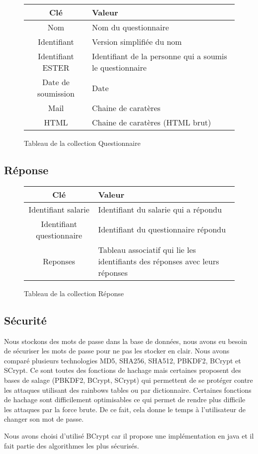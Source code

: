 \begin{figure}[H]
    \begin{center}
        \begin{tabularx}{17cm}{|c|X|}
            \hline
            Clé & Valeur  \tabularnewline 
            \hline
            Nom & 
            Nom du questionnaire \tabularnewline 
            Identifiant & 
            Version simplifiée du nom \tabularnewline
            Identifiant ESTER & 
            Identifiant de la personne qui a soumis le questionnaire \tabularnewline
            Date de soumission & 
            Date \tabularnewline
            Mail & 
            Chaine de caratères \tabularnewline
            HTML & 
            Chaine de caratères (HTML brut) \tabularnewline
            \hline
        \end{tabularx}
    \end{center}
    \caption{Tableau de la collection Questionnaire}
\end{figure}

\subsection{Réponse}

\begin{figure}[H]
    \begin{center}
        \begin{tabularx}{17cm}{|c|X|}
            \hline
            Clé & Valeur  \tabularnewline 
            \hline
            Identifiant salarie & 
            Identifiant du salarie qui a répondu \tabularnewline
            Identifiant questionnaire & 
            Identifiant du questionnaire répondu \tabularnewline
            Reponses & 
            Tableau associatif qui lie les identifiants des réponses 
            avec leurs réponses \tabularnewline
            \hline
        \end{tabularx}
    \end{center}
    \caption{Tableau de la collection Réponse}
\end{figure}
\subsection{Sécurité}

Nous stockons des mots de passe dans la base de données, nous avons eu besoin de sécuriser les mots de passe pour ne pas les stocker en clair.
Nous avons comparé plusieurs technologies MD5, SHA256, SHA512, PBKDF2, BCrypt et SCrypt. Ce sont toutes des fonctions de hachage mais certaines proposent des bases de salage (PBKDF2, BCrypt, SCrypt) qui permettent de se protéger contre les attaques utilisant des rainbows tables ou par dictionnaire. 
Certaines fonctions de hachage sont difficilement optimisables ce qui permet de rendre plus difficile les attaques par la force brute. De ce fait, cela donne le temps à l'utilisateur de changer son mot de passe.     

Nous avons choisi d'utilisé BCrypt car il propose une implémentation en java et il fait partie des algorithmes les plus sécurisés.